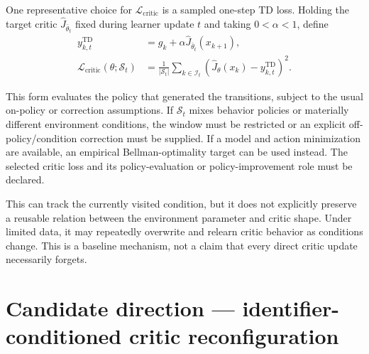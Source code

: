 \documentclass[a4paper]{article}
\begin{document}
One representative choice for $\mathcal L_{\mathrm{critic}}$ is a sampled
one-step TD loss. Holding the target critic $\widehat J_{\bar\theta_t}$ fixed
during learner update $t$ and taking $0<\alpha<1$, define
\begin{equation}
  \begin{aligned}
    y_{k,t}^{\mathrm{TD}}
    &=g_k+\alpha\widehat J_{\bar\theta_t}(x_{k+1}),\\
    \mathcal L_{\mathrm{critic}}(\theta;\mathcal S_t)
    &=\frac{1}{|\mathcal S_t|}
    \sum_{k\in\mathcal I_t}
    \left(
    \widehat J_\theta(x_k)-y_{k,t}^{\mathrm{TD}}
    \right)^2.
  \end{aligned}
\end{equation}

This form evaluates the policy that generated the transitions, subject to the
usual on-policy or correction assumptions. If $\mathcal S_t$ mixes behavior
policies or materially different environment conditions, the window must be
restricted or an explicit off-policy/condition correction must be supplied.
If a model and action minimization are available, an empirical
Bellman-optimality target can be used instead. The selected critic loss and
its policy-evaluation or policy-improvement role must be declared.

This can track the currently visited condition, but it does not explicitly
preserve a reusable relation between the environment parameter and critic
shape. Under limited data, it may repeatedly overwrite and relearn critic
behavior as conditions change. This is a baseline mechanism, not a claim that
every direct critic update necessarily forgets.

\section{Candidate direction --- identifier-conditioned critic reconfiguration}
\end{document}
